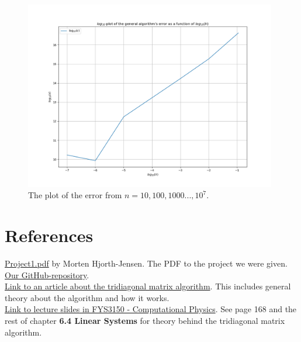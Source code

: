 \documentclass{article}
\begin{document}
\begin{figure}[ht]
	\centering
	\includegraphics[width = 11cm]{program/error.png}
	\caption{The plot of the error from $n = 10, 100, 1000 ... , 10^7$. }
  \label{fig:errorpng}
\end{figure}

\clearpage

\vspace{1cm}

\section{References} \label{sec:References}

\href{https://github.com/CompPhysics/ComputationalPhysics/blob/master/doc/Projects/2019/Project1/pdf/Project1.pdf}{Project1.pdf} by Morten Hjorth-Jensen. The PDF to the project we were given.\\

\href{https://github.com/Erikbgram/Fys3150}{Our GitHub-repository}. \\

\href{http://www.industrial-maths.com/ms6021_thomas.pdf}{Link to an article about the tridiagonal matrix algorithm}. This includes general theory about the algorithm and how it works. \\

\href{https://github.com/CompPhysics/ComputationalPhysics/blob/master/doc/Lectures/lectures2015.pdf}{Link to lecture slides in FYS3150 - Computational Physics}. See page 168 and the rest of chapter \textbf{6.4 Linear Systems} for theory behind the tridiagonal matrix algorithm.






\end{document}
